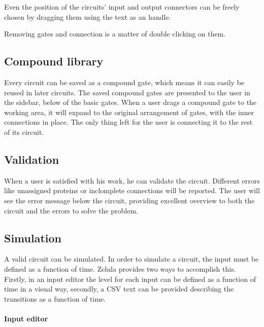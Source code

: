Even the position of the circuits' input and output connectors can be freely chosen by dragging them using the text as an handle.

Removing gates and connection is a matter of double clicking on them.

\subsection{Compound library}
\begin{figure}[h!]
\centering{}
\end{figure}

\noindent Every circuit can be saved as a compound gate, which means it can easily be reused in later circuits. The saved compound gates are presented to the user in the sidebar, below of the basic gates. When a user drags a compound gate to the working area, it will expand to the original arrangement of gates, with the inner connections in place. The only thing left for the user is connecting it to the rest of its circuit.

\subsection{Validation}
When a user is satisfied with his work, he can validate the circuit. Different errors like unassigned proteins or inclomplete connections will be reported. The user will see the error message below the circuit, providing excellent overview to both the circuit and the errors to solve the problem.

\subsection{Simulation}
A valid circuit can be simulated. In order to simulate a circuit, the input must be defined as a function of time. Zelula provides two ways to accomplish this. Firstly, in an input editor the level for each input can be defined as a function of time in a visual way, secondly, a CSV text can be provided describing the transitions as a function of time.

\paragraph{Input editor}
\begin{figure}[h!]
\centering{}
\end{figure}

